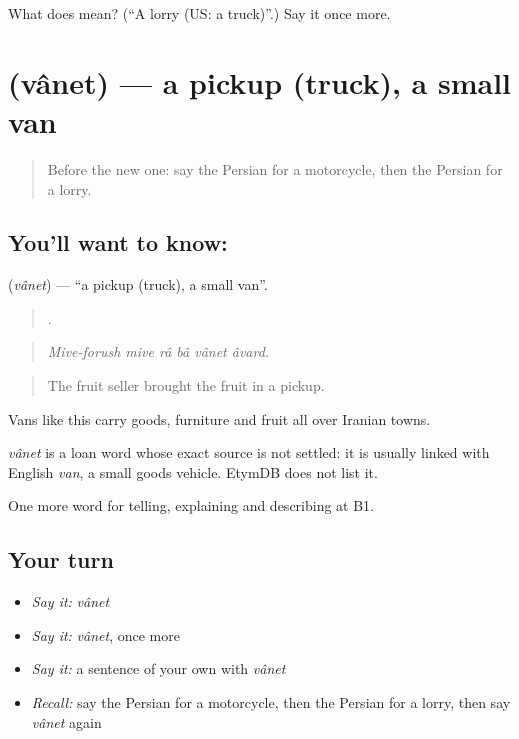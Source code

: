 \begin{tcolorbox}[breakable,colback=teal!4,colframe=teal!35!black,title={Before you move on}]
What does  mean? (\textquotedblleft{}A lorry (US: a truck)\textquotedblright{}.) Say it once more.
\end{tcolorbox}
\section[\texorpdfstring{\fa{وانت} (vânet)}{وانت (vânet)}]{ (vânet) — a pickup (truck), a small van}

\label{lesson:FA-C428-vanet}



\begin{quote}
Before the new one: say the Persian for a motorcycle, then the Persian for a lorry.
\end{quote}

\subsection*{You'll want to know: }
\textbf{} (\emph{vânet}) — \textquotedblleft{}a pickup (truck), a small van\textquotedblright{}.

\begin{quote}
      .
\end{quote}

\begin{quote}
\emph{Mive-forush mive râ bâ vânet âvard.}
\end{quote}

\begin{quote}
The fruit seller brought the fruit in a pickup.
\end{quote}

Vans like this carry goods, furniture and fruit all over Iranian towns.

\begin{cousinweb}
\emph{vânet} is a loan word whose exact source is not settled: it is usually linked with English \emph{van}, a small goods vehicle. EtymDB does not list it.
\end{cousinweb}

\begin{grammarlens}[title={What you've built}]
One more word for telling, explaining and describing at B1.
\end{grammarlens}

\subsection*{Your turn}
\begin{itemize}
\raggedright
  \item \emph{Say it:} \emph{vânet}
  \item \emph{Say it:} \emph{vânet}, once more
  \item \emph{Say it:} a sentence of your own with \emph{vânet}
  \item \emph{Recall:} say the Persian for a motorcycle, then the Persian for a lorry, then say \emph{vânet} again
\end{itemize}

